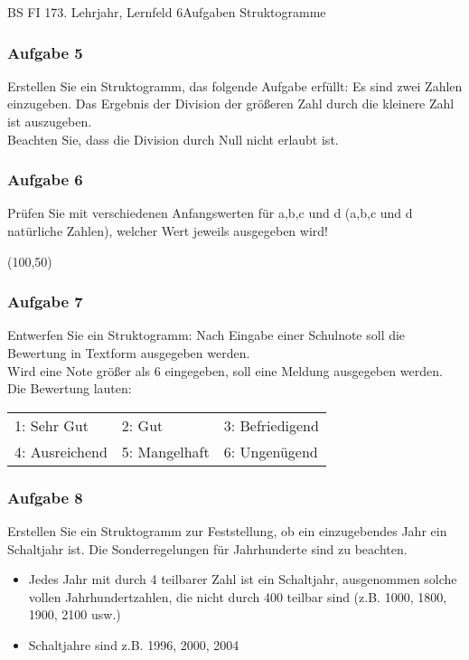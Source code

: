 \documentclass[oneside,openany,headings=optiontotoc,11pt,numbers=noenddot,Nassi]{scrreprt}
\begin{document}
\begin{worksheet}{BS FI 17}{3. Lehrjahr, Lernfeld 6}{Aufgaben Struktogramme}
\begin{framed}
			\subsubsection*{Aufgabe 5}
			Erstellen Sie ein Struktogramm, das folgende Aufgabe erfüllt: Es sind zwei Zahlen einzugeben. Das Ergebnis der Division der größeren Zahl durch die kleinere Zahl ist auszugeben.\\
			Beachten Sie, dass die Division durch Null nicht erlaubt ist.
			\subsubsection*{Aufgabe 6}
			Prüfen Sie mit verschiedenen Anfangswerten für a,b,c und d (a,b,c und d natürliche Zahlen), welcher Wert jeweils ausgegeben wird!\\
			\par\noindent
			\begin{struktogramm}(100,50)
				\change
				\ifend
				\assign[5]{--}
				\change
				\ifend
				\assign[5]{--}
				\change
				\ifend
			\end{struktogramm}
			\subsubsection*{Aufgabe 7}
			Entwerfen Sie ein Struktogramm: Nach Eingabe einer Schulnote soll die Bewertung in Textform ausgegeben werden.\\
			Wird eine Note größer als 6 eingegeben, soll eine Meldung ausgegeben werden.\\
			Die Bewertung lauten:\\
			\begin{tabularx}{\textwidth}{lll}
				1: Sehr Gut & 2: Gut & 3: Befriedigend\\
				4: Ausreichend & 5: Mangelhaft & 6: Ungenügend
			\end{tabularx}
			\subsubsection*{Aufgabe 8}
			Erstellen Sie ein Struktogramm zur Feststellung, ob ein einzugebendes Jahr ein Schaltjahr ist. Die Sonderregelungen für Jahrhunderte sind zu beachten.
			\begin{itemize}[label=-]
				\item Jedes Jahr mit durch 4 teilbarer Zahl ist ein Schaltjahr, ausgenommen solche vollen Jahrhundertzahlen, die nicht durch 400 teilbar sind (z.B. 1000, 1800, 1900, 2100 usw.)
				\item Schaltjahre sind z.B. 1996, 2000, 2004
			\end{itemize}

\end{framed}
\end{worksheet}
\end{document}
